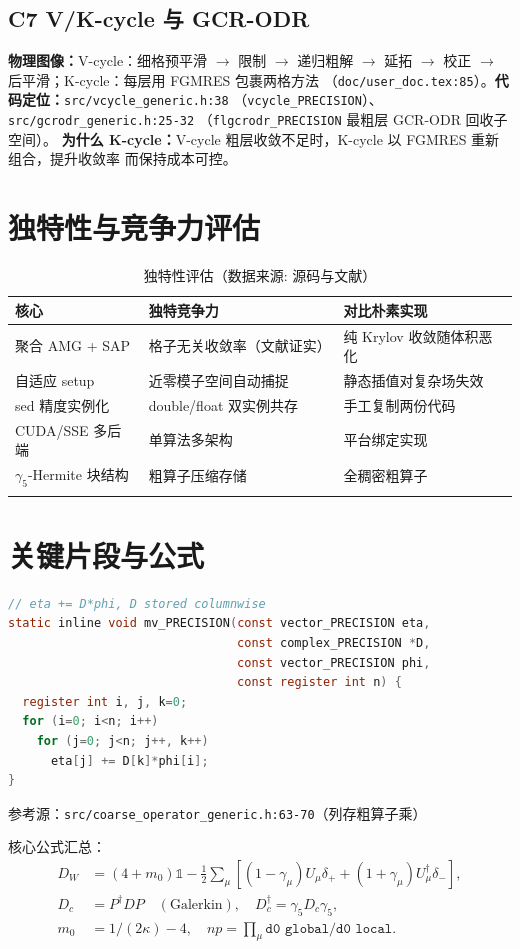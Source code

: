 \documentclass[UTF8]{ctexart}
\begin{document}
\subsection{C7 V/K-cycle 与 GCR-ODR}
\textbf{物理图像：}V-cycle：细格预平滑 $\rightarrow$ 限制 $\rightarrow$ 递归粗解 $\rightarrow$
延拓 $\rightarrow$ 校正 $\rightarrow$ 后平滑；K-cycle：每层用 FGMRES 包裹两格方法
（\texttt{doc/user\_doc.tex:85}）。\textbf{代码定位：}\texttt{src/vcycle\_generic.h:38}
（\texttt{vcycle\_PRECISION}）、\nolinkurl{src/gcrodr_generic.h:25-32}
（\texttt{flgcrodr\_PRECISION} 最粗层 GCR-ODR 回收子空间）。
\textbf{为什么 K-cycle：}V-cycle 粗层收敛不足时，K-cycle 以 FGMRES 重新组合，提升收敛率
而保持成本可控。

\section{独特性与竞争力评估}
\begin{xltabular}{\textwidth}{lXX}
\toprule
\textcolor{algo}{核心} & 独特竞争力 & 对比朴素实现 \\
\midrule
\endhead
聚合 AMG + SAP & 格子无关收敛率（文献证实） & 纯 Krylov 收敛随体积恶化 \\
自适应 setup & 近零模子空间自动捕捉 & 静态插值对复杂场失效 \\
sed 精度实例化 & double/float 双实例共存 & 手工复制两份代码 \\
CUDA/SSE 多后端 & 单算法多架构 & 平台绑定实现 \\
$\gamma_5$-Hermite 块结构 & 粗算子压缩存储 & 全稠密粗算子 \\
\bottomrule
\caption{独特性评估（数据来源: 源码与文献）}
\end{xltabular}

\section{关键片段与公式}
\begin{lstlisting}[language=C]
// eta += D*phi, D stored columnwise
static inline void mv_PRECISION(const vector_PRECISION eta,
                                const complex_PRECISION *D,
                                const vector_PRECISION phi,
                                const register int n) {
  register int i, j, k=0;
  for (i=0; i<n; i++)
    for (j=0; j<n; j++, k++)
      eta[j] += D[k]*phi[i];
}
\end{lstlisting}
参考源：\nolinkurl{src/coarse_operator_generic.h:63-70}（列存粗算子乘）

核心公式汇总：
\begin{align}
D_W &= (4+m_0)\mathbb{1} - \tfrac12\sum_\mu[(1-\gamma_\mu)U_\mu\delta_{+}+(1+\gamma_\mu)U_\mu^\dagger\delta_{-}], \label{eq:w2}\\
D_c &= P^\dagger D P \quad(\text{Galerkin}),\quad D_c^{\dagger}=\gamma_5 D_c\gamma_5, \label{eq:g2}\\
m_0 &= 1/(2\kappa)-4,\quad np=\prod_\mu \texttt{d0 global}/\texttt{d0 local}. \label{eq:m0}
\end{align}
\end{document}
